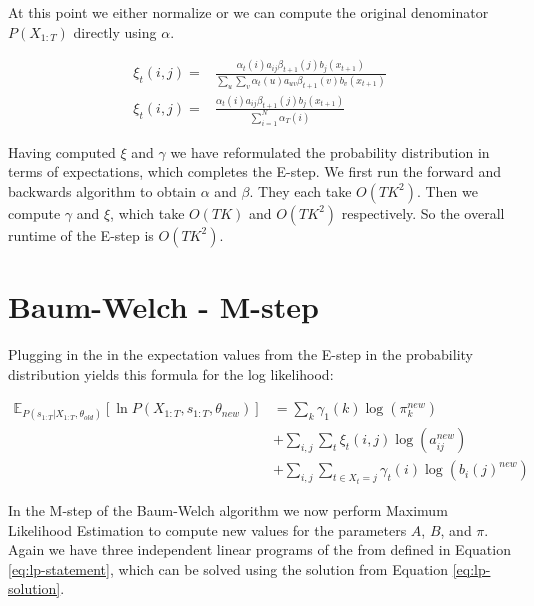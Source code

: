 At this point we either normalize or we can compute the original denominator $P(X_{1:T})$ directly using $\alpha$.

\begin{equation}
\begin{aligned}
\xi_{t}(i, j)=&\frac{\alpha_{t}(i) a_{i j} \beta_{t+1}(j) b_{j}(x_{t+1})}{\sum_{u} \sum_{v} \alpha_{t}(u) a_{u v} \beta_{t+1}(v) b_{v}( x_{t+1})} \\
\xi_{t}(i, j)=&\frac{\alpha_{t}(i) a_{i j} \beta_{t+1}(j) b_{j} (x_{t+1})}{\sum_{i=1}^{N} \alpha_{T}(i)}
\label{eq:xi-def}
\end{aligned}
\end{equation}

Having computed $\xi$ and $\gamma$ we have reformulated the probability distribution in terms of expectations, which completes the E-step. We first run the forward and backwards algorithm to obtain $\alpha$ and $\beta$. They each take $O(TK^2)$. Then we compute $\gamma$ and $\xi$, which take $O(TK)$ and $O(TK^2)$ respectively. So the overall runtime of the E-step is $O(TK^2)$. \parencite{miningmassivedatasets}

\section{Baum-Welch - M-step}

Plugging in the in the expectation values from the E-step in the probability distribution yields this formula for the log likelihood:

\begin{equation}
\begin{aligned}
\mathbb{E}_{P\left(s_{1: T} | X_{1: T}, \theta_{o l d}\right)}\left[\ln P\left(X_{1: T}, s_{1: T}, \theta_{n e w}\right)\right] &=\sum_{k} \gamma_{1}(k) \log \left(\pi_{k}^{n e w}\right) \\
&+\sum_{i, j} \sum_{t} \xi_{t}(i, j) \log \left(a_{i j}^{n e w}\right) \\
&+\sum_{i, j} \sum_{t \in X_t = j} \gamma_{t}(i)   \log \left(b_{i}(j)^{n e w}\right)
\end{aligned}
\end{equation}

In the M-step of the Baum-Welch algorithm we now perform Maximum Likelihood Estimation to compute new values for the parameters $A$, $B$, and $\pi$. Again we have three independent linear programs of the from defined in Equation \eqref{eq:lp-statement}, which can be solved using the solution from Equation \eqref{eq:lp-solution}. 

